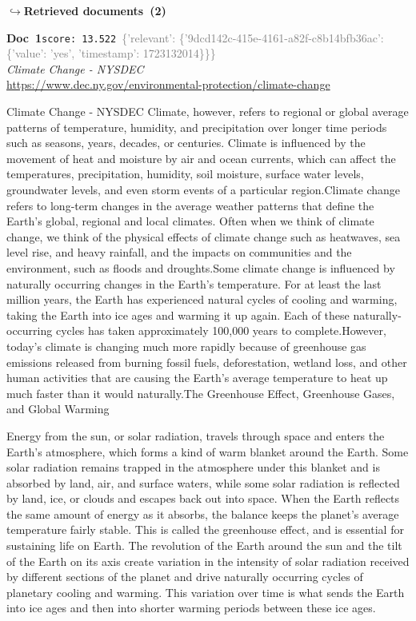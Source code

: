\documentclass[a4paper,11pt]{article}
\begin{document}
\noindent\hfill{\footnotesize\textcolor{doccolor}{\textbf{$\hookrightarrow$\enspace Retrieved documents~(2)}}}
\begin{docenv}
{\footnotesize\textcolor{doccolor}{\textbf{Doc~1}}}\hfill{\tiny\texttt{score:~13.522}}\ {\tiny\textcolor{gray}{\{'relevant': \{'9dcd142c-415e-4161-a82f-c8b14bfb36ac': \{'value': 'yes', 'timestamp': 1723132014\}\}\}}}\\[3pt]
{\small\textit{Climate Change - NYSDEC}}\\[2pt]
{\tiny\url{https://www.dec.ny.gov/environmental-protection/climate-change}}\\[4pt]
{\footnotesize Climate Change - NYSDEC
Climate, however, refers to regional or global average patterns of temperature, humidity, and precipitation over longer time periods such as seasons, years, decades, or centuries. Climate is influenced by the movement of heat and moisture by air and ocean currents, which can affect the temperatures, precipitation, humidity, soil moisture, surface water levels, groundwater levels, and even storm events of a particular region.Climate change refers to long-term changes in the average weather patterns that define the Earth's global, regional and local climates. Often when we think of climate change, we think of the physical effects of climate change such as heatwaves, sea level rise, and heavy rainfall, and the impacts on communities and the environment, such as floods and droughts.Some climate change is influenced by naturally occurring changes in the Earth's temperature. For at least the last million years, the Earth has experienced natural cycles of cooling and warming, taking the Earth into ice ages and warming it up again. Each of these naturally-occurring cycles has taken approximately 100,000 years to complete.However, today's climate is changing much more rapidly because of greenhouse gas emissions released from burning fossil fuels, deforestation, wetland loss, and other human activities that are causing the Earth's average temperature to heat up much faster than it would naturally.The Greenhouse Effect, Greenhouse Gases, and Global Warming

 

Energy from the sun, or solar radiation, travels through space and enters the Earth's atmosphere, which forms a kind of warm blanket around the Earth. Some solar radiation remains trapped in the atmosphere under this blanket and is absorbed by land, air, and surface waters, while some solar radiation is reflected by land, ice, or clouds and escapes back out into space. When the Earth reflects the same amount of energy as it absorbs, the balance keeps the planet's average temperature fairly stable. This is called the greenhouse effect, and is essential for sustaining life on Earth. The revolution of the Earth around the sun and the tilt of the Earth on its axis create variation in the intensity of solar radiation received by different sections of the planet and drive naturally occurring cycles of planetary cooling and warming. This variation over time is what sends the Earth into ice ages and then into shorter warming periods between these ice ages.}
\end{docenv}
\end{document}
